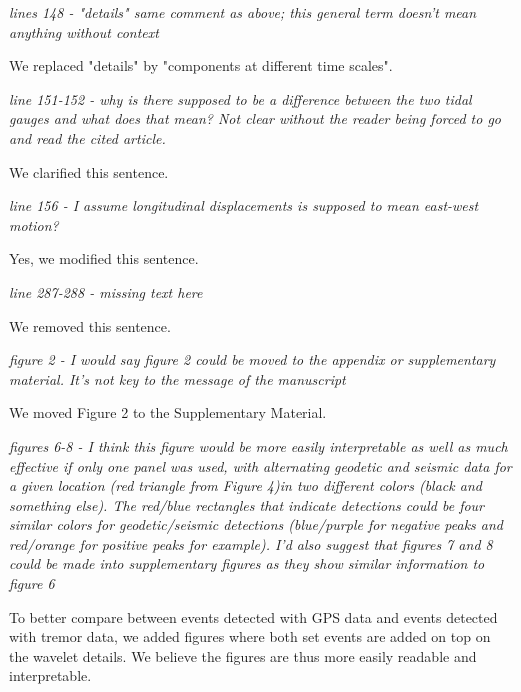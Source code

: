\documentclass[letterpaper, 12pt]{article}
\begin{document}
\bigskip

\textit{lines 148 - "details" same comment as above; this general term doesn't mean anything without context}

\bigskip

We replaced "details" by "components at different time scales".

\bigskip

\textit{line 151-152 - why is there supposed to be a difference between the two tidal gauges and what does that mean? Not clear without the reader being forced to go and read the cited article.}

\bigskip

We clarified this sentence.

\bigskip

\textit{line 156 - I assume longitudinal displacements is supposed to mean east-west motion?}

\bigskip

Yes, we modified this sentence.

\bigskip

\textit{line 287-288 - missing text here}

\bigskip

We removed this sentence.

\bigskip

\textit{figure 2 - I would say figure 2 could be moved to the appendix or supplementary material. It's not key to the message of the manuscript}

\bigskip

We moved Figure 2 to the Supplementary Material.

\bigskip

\textit{figures 6-8 - I think this figure would be more easily interpretable as well as much effective if only one panel was used, with alternating geodetic and seismic data for a given location (red triangle from Figure 4)in two different colors (black and something else). The red/blue rectangles that indicate detections could be four similar colors for geodetic/seismic detections (blue/purple for negative peaks and red/orange for positive peaks for example). I'd also suggest that figures 7 and 8 could be made into supplementary figures as they show similar information to figure 6}

\bigskip

To better compare between events detected with GPS data and events detected with tremor data, we added figures where both set events are added on top on the wavelet details. We believe the figures are thus more easily readable and interpretable.
\end{document}
